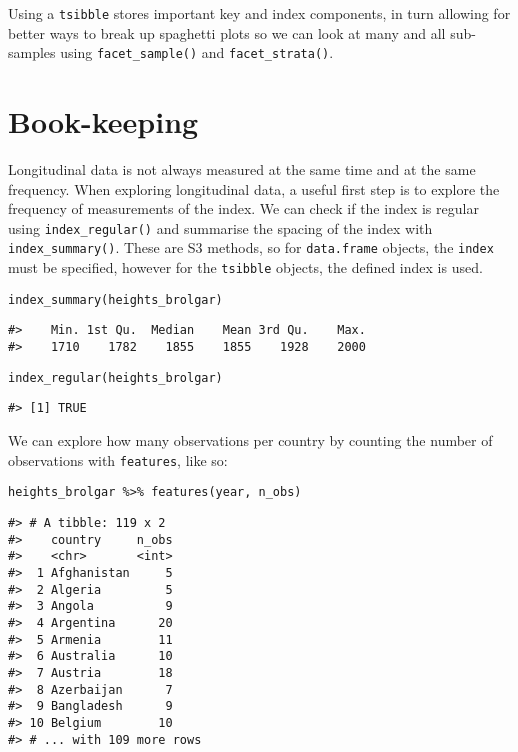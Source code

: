 Using a \texttt{tsibble} stores important key and index components, in turn allowing for better ways to break up spaghetti plots so we can look at many and all sub-samples using \texttt{facet\_sample()} and \texttt{facet\_strata()}.

\hypertarget{book-keeping}{%
\section{Book-keeping}\label{book-keeping}}

Longitudinal data is not always measured at the same time and at the same frequency. When exploring longitudinal data, a useful first step is to explore the frequency of measurements of the index. We can check if the index is regular using \texttt{index\_regular()} and summarise the spacing of the index with \texttt{index\_summary()}. These are S3 methods, so for \texttt{data.frame} objects, the \texttt{index} must be specified, however for the \texttt{tsibble} objects, the defined index is used.

\begin{verbatim}
index_summary(heights_brolgar)
\end{verbatim}

\begin{verbatim}
#>    Min. 1st Qu.  Median    Mean 3rd Qu.    Max. 
#>    1710    1782    1855    1855    1928    2000
\end{verbatim}

\begin{verbatim}
index_regular(heights_brolgar)
\end{verbatim}

\begin{verbatim}
#> [1] TRUE
\end{verbatim}

We can explore how many observations per country by counting the number of observations with \texttt{features}, like so:

\begin{verbatim}
heights_brolgar %>% features(year, n_obs)
\end{verbatim}

\begin{verbatim}
#> # A tibble: 119 x 2
#>    country     n_obs
#>    <chr>       <int>
#>  1 Afghanistan     5
#>  2 Algeria         5
#>  3 Angola          9
#>  4 Argentina      20
#>  5 Armenia        11
#>  6 Australia      10
#>  7 Austria        18
#>  8 Azerbaijan      7
#>  9 Bangladesh      9
#> 10 Belgium        10
#> # ... with 109 more rows
\end{verbatim}

